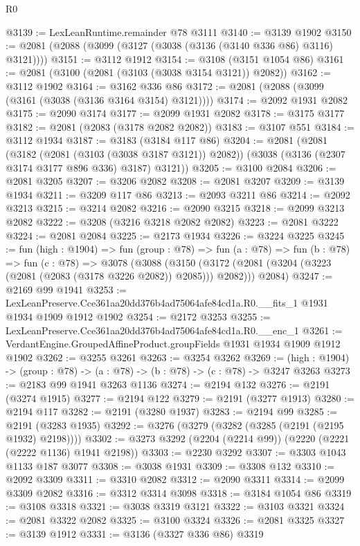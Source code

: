 \begin{lexlean}{R0}
\begin{coremodule}
@3139 := LexLeanRuntime.remainder @78 @3111
@3140 := @3139 @1902
@3150 := @2081 (@2088 (@3099 (@3127 (@3038 (@3136 (@3140 @336 @86) @3116) @3121))))
@3151 := @3112 @1912
@3154 := @3108 (@3151 @1054 @86)
@3161 := @2081 (@3100 (@2081 (@3103 (@3038 @3154 @3121)) @2082))
@3162 := @3112 @1902
@3164 := @3162 @336 @86
@3172 := @2081 (@2088 (@3099 (@3161 (@3038 (@3136 @3164 @3154) @3121))))
@3174 := @2092 @1931 @2082
@3175 := @2090 @3174
@3177 := @2099 @1931 @2082
@3178 := @3175 @3177
@3182 := @2081 (@2083 (@3178 @2082 @2082))
@3183 := @3107 @551
@3184 := @3112 @1934
@3187 := @3183 (@3184 @117 @86)
@3204 := @2081
    (@2081
      (@3182 (@2081 (@3103 (@3038 @3187 @3121)) @2082))
      (@3038 (@3136 (@2307 @3174 @3177 @896 @336) @3187) @3121))
@3205 := @3100 @2084
@3206 := @2081 @3205
@3207 := @3206 @2082
@3208 := @2081 @3207
@3209 := @3139 @1934
@3211 := @3209 @117 @86
@3213 := @2093 @3211 @86
@3214 := @2092 @3213
@3215 := @3214 @2082
@3216 := @2090 @3215
@3218 := @2099 @3213 @2082
@3222 := @3208 (@3216 @3218 @2082 @2082)
@3223 := @2081 @3222
@3224 := @2081 @2084
@3225 := @2173 @1934
@3226 := @3224 @3225
@3245 := fun (high : @1904) =>
  fun (group : @78) =>
  fun (a : @78) =>
  fun (b : @78) =>
  fun (c : @78) =>
  @3078
    (@3088
      (@3150 (@3172 (@2081 (@3204 (@3223 (@2081 (@2083 (@3178 @3226 @2082)) @2085))) @2082)))
      @2084)
@3247 := @2169 @99 @1941
@3253 := LexLeanPreserve.Cce361aa20dd376b4ad75064afe84cd1a.R0.__fits_1 @1931 @1934 @1909 @1912 @1902
@3254 := @2172 @3253
@3255 := LexLeanPreserve.Cce361aa20dd376b4ad75064afe84cd1a.R0.__enc_1
@3261 := VerdantEngine.GroupedAffineProduct.groupFields @1931 @1934 @1909 @1912 @1902
@3262 := @3255 @3261
@3263 := @3254 @3262
@3269 := (high : @1904) -> (group : @78) -> (a : @78) -> (b : @78) -> (c : @78) -> @3247 @3263
@3273 := @2183 @99 @1941 @3263 @1136
@3274 := @2194 @132
@3276 := @2191 (@3274 @1915)
@3277 := @2194 @122
@3279 := @2191 (@3277 @1913)
@3280 := @2194 @117
@3282 := @2191 (@3280 @1937)
@3283 := @2194 @99
@3285 := @2191 (@3283 @1935)
@3292 := @3276 (@3279 (@3282 (@3285 (@2191 (@2195 @1932) @2198))))
@3302 := @3273 @3292 (@2204 (@2214 @99)) (@2220 (@2221 (@2222 @1136) @1941 @2198))
@3303 := @2230 @3292
@3307 := @3303 @1043 @1133 @187 @3077
@3308 := @3038 @1931
@3309 := @3308 @132
@3310 := @2092 @3309
@3311 := @3310 @2082
@3312 := @2090 @3311
@3314 := @2099 @3309 @2082
@3316 := @3312 @3314 @3098
@3318 := @3184 @1054 @86
@3319 := @3108 @3318
@3321 := @3038 @3319 @3121
@3322 := @3103 @3321
@3324 := @2081 @3322 @2082
@3325 := @3100 @3324
@3326 := @2081 @3325
@3327 := @3139 @1912
@3331 := @3136 (@3327 @336 @86) @3319

\end{coremodule}
\end{lexlean}
